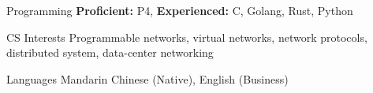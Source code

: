 
\begin{cvskills}
    \cvskill
    {Programming} %
    {\textbf{Proficient:} P4, \textbf{Experienced:} C, Golang, Rust, Python} %
    
    \cvskill
    {CS Interests} %
    {Programmable networks, virtual networks, network protocols, distributed system, data-center networking} %


      \cvskill
        {Languages} %
        {Mandarin Chinese (Native), English (Business)} %
    
\end{cvskills}
